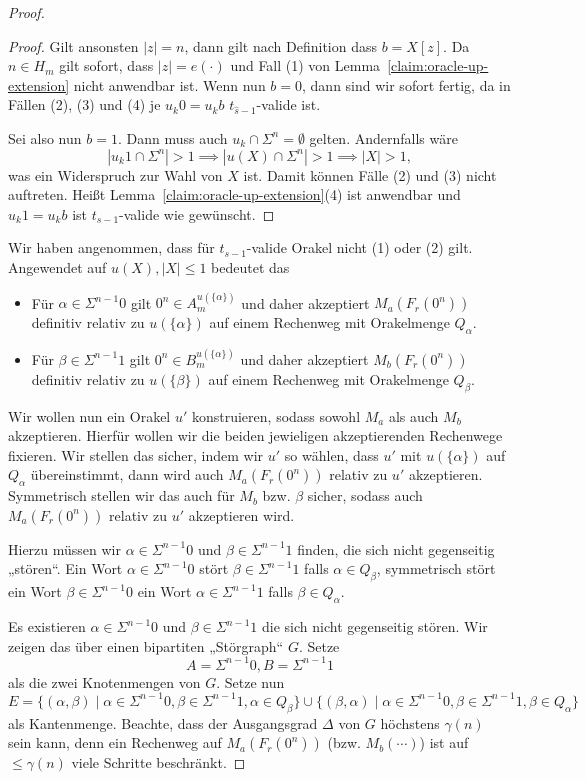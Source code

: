\begin{proof}
\begin{proof}
    Gilt ansonsten $|z|=n$, dann gilt nach Definition dass $b=X[z]$. %
    Da $n\in H_m$ gilt sofort, dass $|z|=e(\cdot)$ und Fall (1) von Lemma~\ref{claim:oracle-up-extension} nicht anwendbar ist.
    Wenn nun $b=0$, dann sind wir sofort fertig, da in Fällen (2), (3) und (4) je $u_k0=u_kb$ $t_{\hat{s}-1}$-valide ist.

    Sei also nun $b=1$. Dann muss auch $u_k\cap\Sigma^n=\emptyset$ gelten. Andernfalls wäre
    \[ |u_{k}1\cap\Sigma^{n}|>1 \implies |u(X)\cap\Sigma^{n}|>1 \implies |X|>1, \]
    was ein Widerspruch zur Wahl von $X$ ist.
    Damit können Fälle (2) und (3) nicht auftreten. Heißt Lemma~\ref{claim:oracle-up-extension}(4) ist anwendbar und $u_k1=u_kb$ ist $t_{s-1}$-valide wie gewünscht.
\end{proof}

Wir haben angenommen, dass für $t_{s-1}$-valide Orakel nicht (1) oder (2) gilt. Angewendet auf $u(X), |X|\leq 1$ bedeutet das
\begin{itemize}[nosep]
    \item Für $\alpha\in \Sigma^{n-1}0$ gilt $0^n\in A_m^{u(\{\alpha\})}$ und daher akzeptiert $M_a(F_r(0^n))$ definitiv relativ zu $u(\{\alpha\})$ auf einem Rechenweg mit Orakelmenge $Q_\alpha$.
    \item Für $\beta\in \Sigma^{n-1}1$ gilt $0^n\in B_m^{u(\{\alpha\})}$ und daher akzeptiert $M_b(F_r(0^n))$ definitiv relativ zu $u(\{\beta\})$ auf einem Rechenweg mit Orakelmenge $Q_\beta$.
\end{itemize}
Wir wollen nun ein Orakel $u'$ konstruieren, sodass sowohl $M_a$ als auch $M_b$ akzeptieren.
Hierfür wollen wir die beiden jewieligen akzeptierenden Rechenwege fixieren.
Wir stellen das sicher, indem wir $u'$ so wählen, dass $u'$ mit $u(\{\alpha\})$ auf $Q_\alpha$ übereinstimmt, dann wird auch $M_a(F_r(0^n))$ relativ zu $u'$ akzeptieren.
Symmetrisch stellen wir das auch für $M_b$ bzw. $\beta$ sicher, sodass auch $M_a(F_r(0^n))$ relativ zu $u'$ akzeptieren wird.

Hierzu müssen wir $\alpha\in\Sigma^{n-1}0$ und $\beta\in\Sigma^{n-1}1$ finden, die sich nicht gegenseitig „stören“.
Ein Wort $\alpha\in\Sigma^{n-1}0$ stört $\beta\in\Sigma^{n-1}1$ falls $\alpha\in Q_\beta$, 
symmetrisch stört ein Wort $\beta\in\Sigma^{n-1}0$ ein Wort  $\alpha\in\Sigma^{n-1}1$ falls $\beta\in Q_\alpha$.

Es existieren $\alpha\in\Sigma^{n-1}0$ und $\beta\in\Sigma^{n-1}1$ die sich nicht gegenseitig stören. Wir zeigen das über einen bipartiten „Störgraph“ $G$.
Setze 
\[ A=\Sigma^{n-1}0, B=\Sigma^{n-1}1 \]
als die zwei Knotenmengen von $G$.
Setze nun
\[ E = \{ (\alpha, \beta) \mid \alpha\in\Sigma^{n-1}0, \beta\in\Sigma^{n-1}1, \alpha\in Q_\beta\} \cup \{ (\beta, \alpha) \mid \alpha\in\Sigma^{n-1}0, \beta\in\Sigma^{n-1}1, \beta\in Q_\alpha\} \]
als Kantenmenge.
Beachte, dass der Ausgangsgrad $\Delta$ von $G$ höchstens $\gamma(n)$ sein kann, denn ein Rechenweg auf $M_a(F_r(0^n))$ (bzw. $M_b(\cdots)$) ist auf $\leq \gamma(n)$ viele Schritte beschränkt.


\end{proof}
